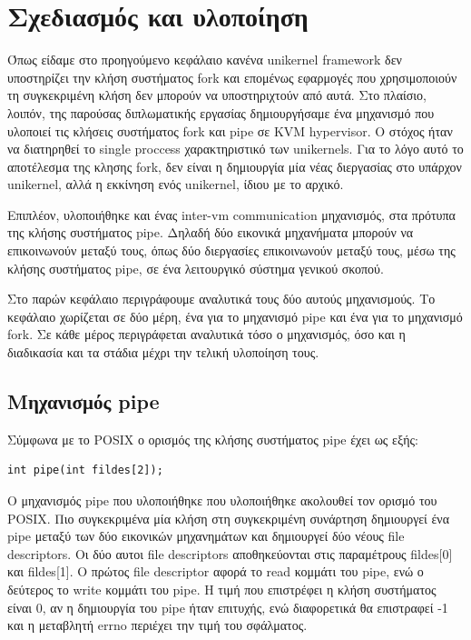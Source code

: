 \chapter{Σχεδιασμός και υλοποίηση}
\label{chap:implementation}

Όπως είδαμε στο προηγούμενο κεφάλαιο κανένα unikernel framework δεν υποστηρίζει
την κλήση συστήματος fork και επομένως εφαρμογές που χρησιμοποιούν τη
συγκεκριμένη κλήση δεν μπορούν να υποστηριχτούν από αυτά. Στο πλαίσιο, λοιπόν,
της παρούσας διπλωματικής εργασίας δημιουργήσαμε ένα μηχανισμό που
υλοποιεί τις κλήσεις συστήματος fork και pipe σε KVM hypervisor. Ο στόχος ήταν
να διατηρηθεί το single proccess χαρακτηριστικό των unikernels. Για το λόγο
αυτό το αποτέλεσμα της κλησης fork, δεν είναι η δημιουργία μία νέας διεργασίας
στο υπάρχον unikernel, αλλά η εκκίνηση ενός unikernel, ίδιου με το αρχικό. 

Επιπλέον, υλοποιήθηκε και ένας inter-vm communication μηχανισμός, στα πρότυπα
της κλήσης συστήματος pipe. Δηλαδή δύο εικονικά μηχανήματα μπορούν να
επικοινωνούν μεταξύ τους, όπως δύο διεργασίες επικοινωνούν μεταξύ τους, μέσω της
κλήσης συστήματος pipe, σε ένα λειτουργικό σύστημα γενικού σκοπού. 

Στο παρών κεφάλαιο περιγράφουμε αναλυτικά τους δύο αυτούς μηχανισμούς. Το
κεφάλαιο χωρίζεται σε δύο μέρη, ένα για το μηχανισμό pipe και ένα για το
μηχανισμό fork. Σε κάθε μέρος περιγράφεται αναλυτικά τόσο ο μηχανισμός, όσο και
η διαδικασία και τα στάδια μέχρι την τελική υλοποίηση τους.

\newpage
\section{Μηχανισμός pipe}

Σύμφωνα με το POSIX ο ορισμός της κλήσης συστήματος pipe έχει ως εξής:
\begin{lstlisting}[numbers=none,  xleftmargin=.2\textwidth, xrightmargin=.2\textwidth]
int pipe(int fildes[2]);
\end{lstlisting}
Ο μηχανισμός pipe που υλοποιήθηκε που υλοποιήθηκε ακολουθεί τον ορισμό του
POSIX. Πιο συγκεκριμένα μία κλήση στη συγκεκριμένη συνάρτηση δημιουργεί ένα pipe
μεταξύ των δύο εικονικών μηχανημάτων και δημιουργεί δύο νέους file descriptors.
Οι δύο αυτοι file descriptors αποθηκεύονται στις παραμέτρους fildes[0] και
fildes[1]. Ο πρώτος file descriptor αφορά το read κομμάτι του pipe, ενώ ο
δεύτερος το write κομμάτι του pipe. Η τιμή που επιστρέφει η κλήση συστήματος
είναι 0, αν η δημιουργία του pipe ήταν επιτυχής, ενώ διαφορετικά θα επιστραφεί
-1 και η μεταβλητή errno περιέχει την τιμή του σφάλματος.

